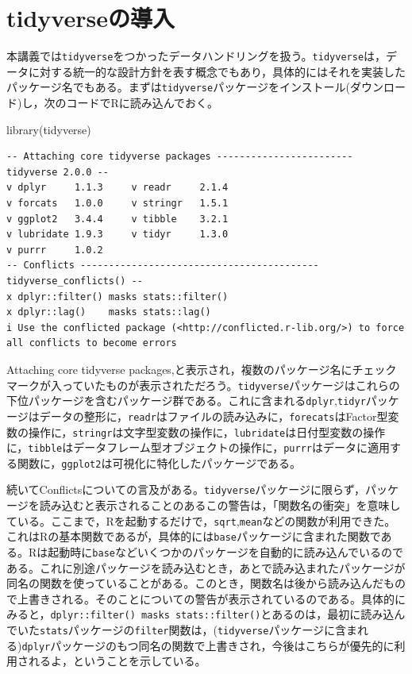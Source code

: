 \documentclass[
  a4paper,
]{ltjsbook}
\newenvironment{Shaded}{\begin{snugshade}}{\end{snugshade}}
\newcommand{\FunctionTok}[1]{\textcolor[rgb]{0.28,0.35,0.67}{#1}}
\newcommand{\NormalTok}[1]{\textcolor[rgb]{0.00,0.23,0.31}{#1}}
\begin{document}
\section{tidyverseの導入}\label{tidyverseux306eux5c0eux5165}

本講義では\texttt{tidyverse}をつかったデータハンドリングを扱う。\texttt{tidyverse}は，データに対する統一的な設計方針を表す概念でもあり，具体的にはそれを実装したパッケージ名でもある。まずは\texttt{tidyverse}パッケージをインストール(ダウンロード)し，次のコードでRに読み込んでおく。

\begin{Shaded}
\begin{Highlighting}[]
\FunctionTok{library}\NormalTok{(tidyverse)}
\end{Highlighting}
\end{Shaded}

\begin{verbatim}
-- Attaching core tidyverse packages ------------------------ tidyverse 2.0.0 --
v dplyr     1.1.3     v readr     2.1.4
v forcats   1.0.0     v stringr   1.5.1
v ggplot2   3.4.4     v tibble    3.2.1
v lubridate 1.9.3     v tidyr     1.3.0
v purrr     1.0.2     
-- Conflicts ------------------------------------------ tidyverse_conflicts() --
x dplyr::filter() masks stats::filter()
x dplyr::lag()    masks stats::lag()
i Use the conflicted package (<http://conflicted.r-lib.org/>) to force all conflicts to become errors
\end{verbatim}

Attaching core tidyverse
packages,と表示され，複数のパッケージ名にチェックマークが入っていたものが表示されただろう。\texttt{tidyverse}パッケージはこれらの下位パッケージを含むパッケージ群である。これに含まれる\texttt{dplyr},\texttt{tidyr}パッケージはデータの整形に，\texttt{readr}はファイルの読み込みに，\texttt{forecats}はFactor型変数の操作に，\texttt{stringr}は文字型変数の操作に，\texttt{lubridate}は日付型変数の操作に，\texttt{tibble}はデータフレーム型オブジェクトの操作に，\texttt{purrr}はデータに適用する関数に，\texttt{ggplot2}は可視化に特化したパッケージである。

続いてConflictsについての言及がある。\texttt{tidyverse}パッケージに限らず，パッケージを読み込むと表示されることのあるこの警告は，「関数名の衝突」を意味している。ここまで，Rを起動するだけで，\texttt{sqrt},\texttt{mean}などの関数が利用できた。これはRの基本関数であるが，具体的には\texttt{base}パッケージに含まれた関数である。Rは起動時に\texttt{base}などいくつかのパッケージを自動的に読み込んでいるのである。これに別途パッケージを読み込むとき，あとで読み込まれたパッケージが同名の関数を使っていることがある。このとき，関数名は後から読み込んだもので上書きされる。そのことについての警告が表示されているのである。具体的にみると，\texttt{dplyr::filter()\ masks\ stats::filter()}とあるのは，最初に読み込んでいた\texttt{stats}パッケージの\texttt{filter}関数は，(\texttt{tidyverse}パッケージに含まれる)\texttt{dplyr}パッケージのもつ同名の関数で上書きされ，今後はこちらが優先的に利用されるよ，ということを示している。
\end{document}
